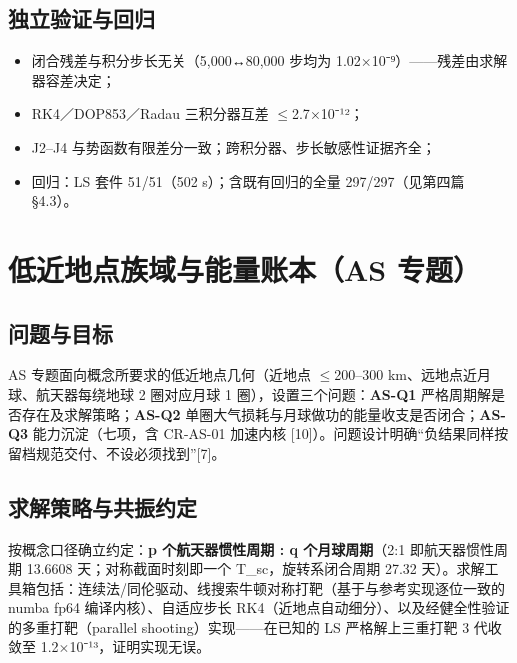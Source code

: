 \documentclass[UTF8,fontset=none]{ctexbook}
\begin{document}
\chapter{独立验证与回归}
\begin{itemize}
\item 闭合残差与积分步长无关（5,000↔80,000 步均为 1.02$\times$10⁻⁹）——残差由求解器容差决定；
\item RK4／DOP853／Radau 三积分器互差 $\leq$2.7$\times$10⁻¹²；
\item J2–J4 与势函数有限差分一致；跨积分器、步长敏感性证据齐全；
\item 回归：LS 套件 51/51（502 s）；含既有回归的全量 297/297（见第四篇 §4.3）。
\end{itemize}
\part{低近地点族域与能量账本（AS 专题）}
\chapter{问题与目标}
AS 专题面向概念所要求的低近地点几何（近地点 $\leq$200–300 km、远地点近月球、航天器每绕地球 2 圈对应月球 1 圈），设置三个问题：\textbf{AS-Q1} 严格周期解是否存在及求解策略；\textbf{AS-Q2} 单圈大气损耗与月球做功的能量收支是否闭合；\textbf{AS-Q3} 能力沉淀（七项，含 CR-AS-01 加速内核 [10]）。问题设计明确“负结果同样按留档规范交付、不设必须找到”[7]。\par
\chapter{求解策略与共振约定}
按概念口径确立约定：\textbf{p 个航天器惯性周期 : q 个月球周期}（2:1 即航天器惯性周期 13.6608 天；对称截面时刻即一个 T\_sc，旋转系闭合周期 27.32 天）。求解工具箱包括：连续法/同伦驱动、线搜索牛顿对称打靶（基于与参考实现逐位一致的 numba fp64 编译内核）、自适应步长 RK4（近地点自动细分）、以及经健全性验证的多重打靶（parallel shooting）实现——在已知的 LS 严格解上三重打靶 3 代收敛至 1.2$\times$10⁻¹³，证明实现无误。\par
\end{document}
